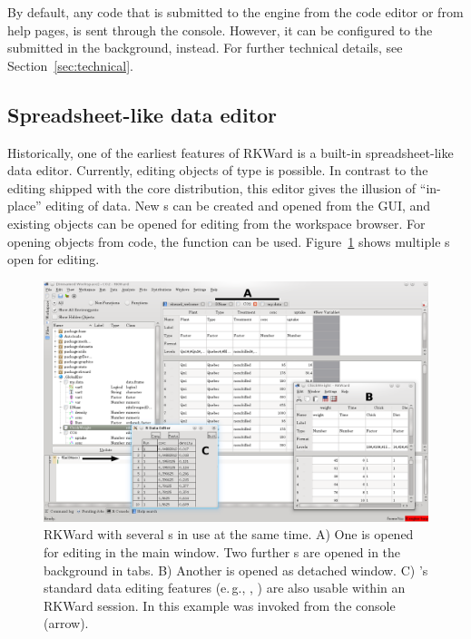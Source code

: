By default, any code that is submitted to the
 engine from the code editor or from help
pages, is sent through the  console.
However, it can be configured to the submitted in the background,
instead.
For further technical details, see Section~\ref{sec:technical}.

\subsection{Spreadsheet-like data editor}
\label{sec:spreadsheet}

Historically, one of the earliest
features of RKWard is a built-in spreadsheet-like data editor.
Currently, editing  objects of type
 is possible. In contrast to the  editing shipped
with the  core distribution, this editor
gives the illusion of ``in-place'' editing of data. New s can
be created and opened from the GUI, and existing objects can be opened
for editing from the workspace browser. For opening objects from
 code, the function  can be used.
Figure~\ref{fig:data_editors} shows multiple s open for editing.

\begin{figure}[htp]
 \centering
 \includegraphics[width=15.5cm]{../figures/data_editors.png}
 \caption{RKWard with several s in use at the same time. A) 
  One  is opened for editing in the main window. Two further s
  are opened in the background in tabs. 
  B) Another  is opened as detached window. 
  C) 's standard data editing features (e.\,g., , ) 
  are also usable within an RKWard session. In this example  
  was invoked from the console (arrow).}
 \label{fig:data_editors}
\end{figure}

